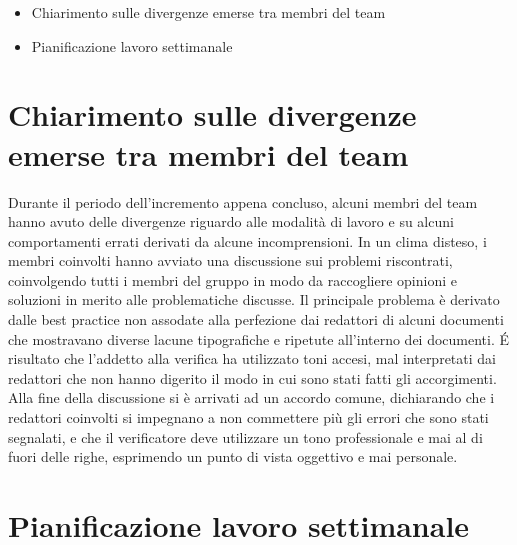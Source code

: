 \documentclass{article}
\begin{document}
\begin{itemize}
  \item Chiarimento sulle divergenze emerse tra membri del team
  \item Pianificazione lavoro settimanale
\end{itemize}

\section{Chiarimento sulle divergenze emerse tra membri del team}%
\label{sec:chiarimento_sulle_divergenze_emerse_tra_membri_del_team}

Durante il periodo dell'incremento appena concluso, alcuni membri del team hanno avuto delle divergenze riguardo alle modalità di lavoro e su alcuni comportamenti errati derivati da alcune incomprensioni.
In un clima disteso, i membri coinvolti hanno avviato una discussione sui problemi riscontrati, coinvolgendo tutti i membri del gruppo in modo da raccogliere opinioni e soluzioni in merito alle problematiche discusse.
Il principale problema è derivato dalle best practice non assodate alla perfezione dai redattori di alcuni documenti che mostravano diverse lacune tipografiche e ripetute all'interno dei documenti. É risultato che l'addetto alla verifica ha utilizzato toni accesi, mal interpretati dai redattori che non hanno digerito il modo in cui sono stati fatti gli accorgimenti.
Alla fine della discussione si è arrivati ad un accordo comune, dichiarando che i redattori coinvolti si impegnano a non commettere più gli errori che sono stati segnalati, e che il verificatore deve utilizzare un tono professionale e mai al di fuori delle righe, esprimendo un punto di vista oggettivo e mai personale.

\section{Pianificazione lavoro settimanale}%
\label{sec:pianificazione_lavoro_settimanale}
\end{document}
